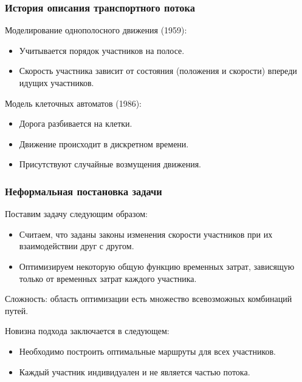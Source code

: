 \documentclass{beamer}
\begin{document}
\begin{frame}\frametitle{История описания транспортного потока}
	
	Моделирование однополосного движения (1959):
	\begin{itemize}
		\item Учитывается порядок участников на полосе.
		
		\item Скорость участника зависит от состояния (положения и скорости) впереди идущих участников.
	\end{itemize}

	\bigskip
	
	Модель клеточных автоматов (1986):
	\begin{itemize}
		\item Дорога разбивается на клетки.
		
		\item Движение происходит в дискретном времени.
		
		\item Присутствуют случайные возмущения движения.
	\end{itemize}
\end{frame}

\begin{frame}\frametitle{Неформальная постановка задачи}
	
	Поставим задачу следующим образом:
	
	\begin{itemize}
		\item Считаем, что заданы законы изменения скорости участников при их взаимодействии друг с другом.
		
		\item Оптимизируем некоторую общую функцию временных затрат, зависящую только от временных затрат каждого участника.
	\end{itemize}
	\bigskip
	Сложность: область оптимизации есть множество всевозможных комбинаций путей.
	
	\bigskip
	
	Новизна подхода заключается в следующем:
	\begin{itemize}
		\item Необходимо построить оптимальные маршруты для всех участников.
		
		\item Каждый участник индивидуален и не является частью потока.
	\end{itemize}

	\bigskip


\end{frame}
\end{document}
